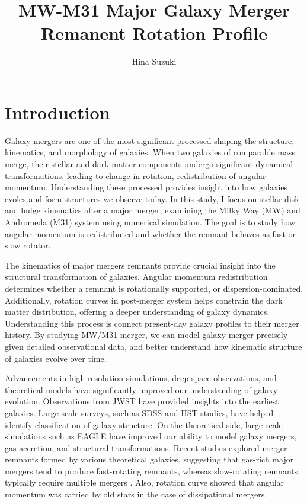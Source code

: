 \documentclass[twocolumn, trackchanges]{aastex7}
\begin{document}
\title{MW-M31 Major Galaxy Merger Remanent Rotation Profile}

\author{Hina Suzuki}

\section{Introduction} 

Galaxy mergers are one of the most significant processed shaping the structure, kinematics, and morphology of galaxies. When two galaxies of comparable mass merge, their stellar and dark matter components undergo significant dynamical transformations, leading to change in rotation, redistribution of angular momentum. Understanding these processed provides insight into how galaxies evoles and form structures we observe today. In this study, I focus on stellar disk and bulge kinematics after a major merger, examining the Milky Way (MW) and Andromeda (M31) system using numerical simulation. The goal is to study how angular momentum is redistributed and whether the remnant behaves as fast or slow rotator. 

The kinematics of major mergers remnants provide crucial insight into the structural transformation of galaxies. Angular momentum redistribution determines whether a remnant is rotationally supported, or dispersion-dominated. Additionally, rotation curves in post-merger system helps constrain the dark matter distribution, offering a deeper understanding of galaxy dynamics. Understanding this process is connect present-day galaxy profiles to their merger history. By studying MW/M31 merger, we can model galaxy merger precisely given detailed observational data, and better understand how kinematic structure of galaxies evolve over time. 

Advancements in high-resolution simulations, deep-space observations, and theoretical models have significantly improved our understanding of galaxy evolution. Observations from JWST have provided insights into the earliest galaxies. Large-scale surveys, such as SDSS and HST studies, have helped identify classification of galaxy structure. On the theoretical side, large-scale simulations such as EAGLE \citep{2015MNRAS.446..521S} have improved our ability to model galaxy mergers, gas accretion, and structural transformations. Recent studies explored merger remnants formed by various theoretical galaxies, suggesting that gas-rich major mergers tend to produce fast-rotating remnants, whereas slow-rotating remnants typically require multiple mergers \citep{Cox_2006, Naab}. Also, rotation curve showed that angular momentum was carried by old stars in the case of dissipational mergers.
\end{document}
